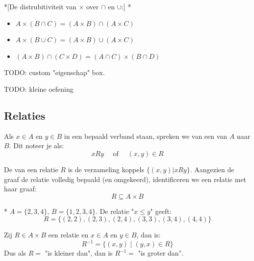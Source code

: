 \begin{nicetheorem}*[De distrubitiviteit van $\times$ over $\cap$ en $\cup$:]
    \nextpart[]*
    \begin{itemize}
        \item $A \times (B \cap C) = (A \times B) \cap (A \times C)$
        \item $A \times (B \cup C) = (A \times B) \cup (A \times C)$
        \item $(A \times B) \cap (C \times D) = (A \cap C) \times (B \cap D)$
    \end{itemize}
\end{nicetheorem}

\colorbox{green!66}{TODO: custom "eigenschap" box.}

\colorbox{magenta!66}{TODO: kleine oefening}

\subsection{Relaties}

Als $x \in A$ en $y \in B$ in een bepaald verband staan, spreken we van een  van $A$ naar $B$. Dit noteer je als:
\begin{equation}
    xRy \quad \text{ of } \quad (x, y) \in R
\end{equation}

De  van een relatie $R$ is de verzameling koppels $\{(x,y) | xRy\}$. Aangezien de graaf de relatie volledig bepaald (en omgekeerd), identificeren we een relatie met haar graaf:
\begin{equation}
    R \subseteq A \times B
\end{equation}

\begin{niceexample}*
    \nextpart[Voorbeeld:]
    $A = \{2,3,4\}$, $B=\{1,2,3,4\}$. De relatie "$x \leq y$" geeft:
    \begin{equation*}
        R = \{(2,2), (2,3), (2,4), (3,3), (3,4), (4,4)\}
    \end{equation*}
    \begin{center}
        \resizebox{0.5\textwidth}{!}{
            
        }
    \end{center}
\end{niceexample}


Zij $R \in A \times B$ een relatie en $x \in A$ en $y \in B$, dan is:
\begin{equation}
    R^{-1} = \{(x,y) \mid (y,x) \in R\}
\end{equation}
Dus als $R=$ "is kleiner dan", dan is $R^{-1}=$ "is groter dan".

